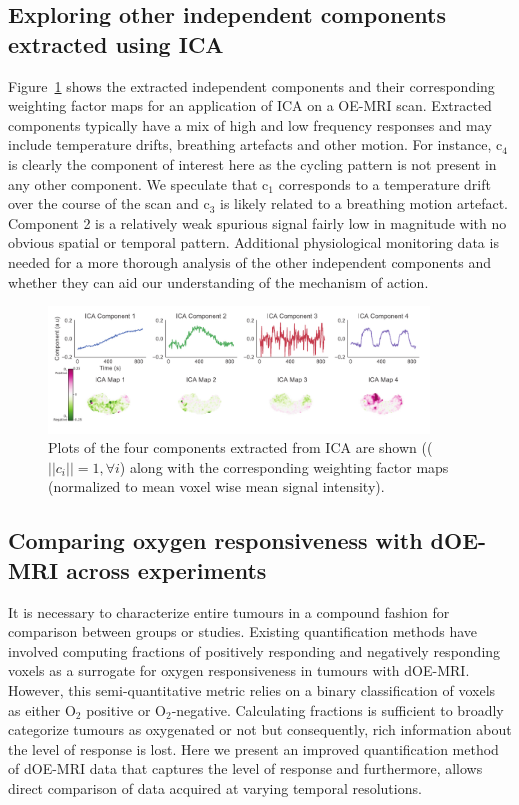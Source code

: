 \subsection{Exploring other independent components extracted using \acs{ICA}}

Figure~\ref{Sfig_components} shows the extracted independent components and their corresponding weighting factor maps for an application of \acs{ICA} on a OE-MRI scan.
Extracted components typically have a mix of high and low frequency responses and may include temperature drifts, breathing artefacts and other motion. 
For instance, c$_4$ is clearly the component of interest here as the cycling pattern is not present in any other component. 
We speculate that c$_1$ corresponds to a temperature drift over the course of the scan and c$_3$ is likely related to a breathing motion artefact. 
Component 2 is a relatively weak spurious signal fairly low in magnitude with no obvious spatial or temporal pattern. 
Additional physiological monitoring data is needed for a more thorough analysis of the other independent components and whether they can aid our understanding of the mechanism of action.

\begin{figure}[htbp]
   \centering
   \includegraphics[width=0.9\textwidth]{oemri_thesis1/oemri_thesis1-images/fig_components.pdf} %
   \caption{Plots of the four components extracted from \acs{ICA} are shown (($||c_i||=1, \forall i $) along with the corresponding  weighting factor maps (normalized to mean voxel wise mean signal intensity).
   \label{Sfig_components}}
\end{figure}

\subsection{Comparing oxygen responsiveness with \acs{dOE-MRI} across experiments}
\label{sec:correctionfactor}
It is necessary to characterize entire tumours in a compound fashion for comparison between groups or studies. 
Existing quantification methods have involved computing fractions of positively responding and negatively responding voxels as a surrogate for oxygen responsiveness in tumours with \acs{dOE-MRI}.
However, this semi-quantitative metric relies on a binary classification of voxels as either O$_2$ positive or O$_2$-negative.
Calculating fractions is sufficient to broadly categorize tumours as oxygenated or not but consequently, rich information about the level of response is lost.
Here we present an improved quantification method of \acs{dOE-MRI} data that captures the level of response and furthermore, allows direct comparison of data acquired at varying temporal resolutions.

